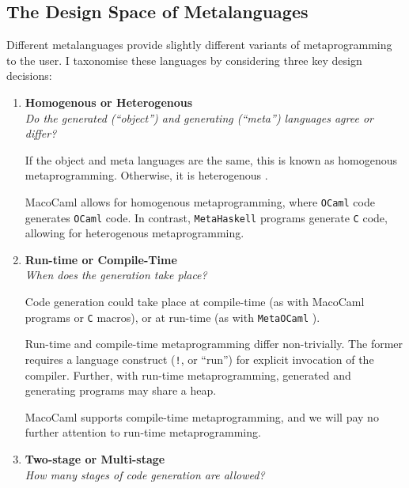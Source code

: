 \subsection{The Design Space of Metalanguages}\label{subsection:metaprogramming-design}
Different metalanguages provide slightly different variants of metaprogramming to the user. I taxonomise these languages by considering three key design decisions:
\begin{enumerate}
  \item \textbf{\textsf{Homogenous or Heterogenous}}\\
         \textit{Do the generated (``object'') and generating (``meta'') languages agree or differ?}
  
        If the object and meta languages are the same, this is known as {homogenous} metaprogramming. Otherwise, it is {heterogenous} \citep{kiselyov-2024}.

        MacoCaml allows for homogenous metaprogramming, where \texttt{OCaml} code generates \texttt{OCaml} code. In contrast, \texttt{MetaHaskell} \citep{mainland-2012} programs generate \texttt{C} code, allowing for heterogenous metaprogramming. 

  \item \textbf{\textsf{Run-time or Compile-Time}} \\
        \textit{When does the generation take place?}

        Code generation could take place at compile-time (as with MacoCaml programs or \texttt{C} macros), or at run-time (as with \texttt{MetaOCaml} \citep{kiselyov-14}). 

        
        Run-time and compile-time metaprogramming differ non-trivially. The former requires a language construct (\texttt{!}, or ``run'') for explicit invocation of the compiler. Further, with run-time metaprogramming, generated and generating programs may share a heap. 

        MacoCaml supports compile-time metaprogramming, and we will pay no further attention to run-time metaprogramming.
        
  \item \textbf{\textsf{Two-stage or Multi-stage}} \\
  \textit{How many stages of code generation are allowed?}


\end{enumerate}
